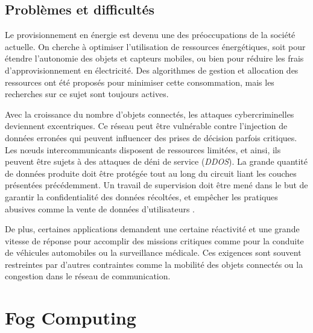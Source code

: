 \subsection{Problèmes et difficultés}
Le provisionnement en énergie est devenu une des préoccupations de la société actuelle. On cherche à optimiser l'utilisation de ressources énergétiques, soit pour étendre l'autonomie des objets et capteurs mobiles, ou bien pour réduire les frais d'approvisionnement en électricité. Des algorithmes de gestion et allocation des ressources ont été proposés pour minimiser cette consommation, mais les recherches sur ce sujet sont toujours actives.\par
Avec la croissance du nombre d'objets connectés, les attaques cybercriminelles deviennent excentriques. Ce réseau peut être vulnérable contre l'injection de données erronées qui peuvent influencer des prises de décision parfois critiques. Les nœuds intercommunicants disposent de ressources limitées, et ainsi, ils peuvent être sujets à des attaques de déni de service (\emph{DDOS}). La grande quantité de données produite doit être protégée tout au long du circuit liant les couches présentées précédemment. Un travail de supervision doit être mené dans le but de garantir la confidentialité des données récoltées, et empêcher les pratiques abusives comme la vente de données d'utilisateurs \cite{COLAKOVIC201817}.\par
De plus, certaines applications demandent une certaine réactivité et une grande vitesse de réponse pour accomplir des missions critiques comme pour la conduite de véhicules automobiles ou la surveillance médicale. Ces exigences sont souvent restreintes par d'autres contraintes comme la mobilité des objets connectés ou la congestion dans le réseau de communication.
\section{Fog Computing}

